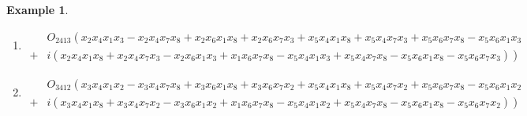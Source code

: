 \documentclass[aps,preprint]{revtex4}%
\newtheorem{example}[theorem]{Example}
\begin{document}
\begin{example}
\begin{enumerate}
\item
\begin{align}
&  O_{2413}\left(  \overset{}{x_{2}x_{4}x_{1}x_{3}-x_{2}x_{4}x_{7}x_{8}%
+x_{2}x_{6}x_{1}x_{8}+x_{2}x_{6}x_{7}x_{3}+x_{5}x_{4}x_{1}x_{8}+x_{5}%
x_{4}x_{7}x_{3}+x_{5}x_{6}x_{7}x_{8}-x_{5}x_{6}x_{1}x_{3}}\right. \\
+  &  \left.  i\left(  \overset{}{x_{2}x_{4}x_{1}x_{8}+x_{2}x_{4}x_{7}%
x_{3}-x_{2}x_{6}x_{1}x_{3}+x_{1}x_{6}x_{7}x_{8}-x_{5}x_{4}x_{1}x_{3}%
+x_{5}x_{4}x_{7}x_{8}-x_{5}x_{6}x_{1}x_{8}-x_{5}x_{6}x_{7}x_{3}}\right)
\right)
\end{align}


\item
\begin{align}
&  O_{3412}\left(  \overset{}{x_{3}x_{4}x_{1}x_{2}-x_{3}x_{4}x_{7}x_{8}%
+x_{3}x_{6}x_{1}x_{8}+x_{3}x_{6}x_{7}x_{2}+x_{5}x_{4}x_{1}x_{8}+x_{5}%
x_{4}x_{7}x_{2}+x_{5}x_{6}x_{7}x_{8}-x_{5}x_{6}x_{1}x_{2}}\right. \\
+  &  \left.  i\left(  \overset{}{x_{3}x_{4}x_{1}x_{8}+x_{3}x_{4}x_{7}%
x_{2}-x_{3}x_{6}x_{1}x_{2}+x_{1}x_{6}x_{7}x_{8}-x_{5}x_{4}x_{1}x_{2}%
+x_{5}x_{4}x_{7}x_{8}-x_{5}x_{6}x_{1}x_{8}-x_{5}x_{6}x_{7}x_{2}}\right)
\right)
\end{align}

\end{enumerate}
\end{example}
\end{document}
